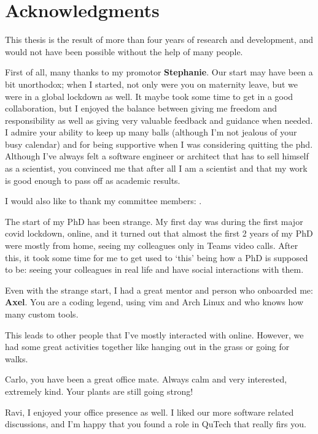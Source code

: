 \chapter*{Acknowledgments}

This thesis is the result of more than four years of research and development, and would not have been possible without the help of many people.

First of all, many thanks to my promotor \textbf{Stephanie}.
Our start may have been a bit unorthodox; when I started, not only were you on maternity leave, but we were in a global lockdown as well.
It maybe took some time to get in a good collaboration, but I enjoyed the balance between giving me freedom and responsibility as well as giving very valuable feedback and guidance when needed.
I admire your ability to keep up many balls (although I'm not jealous of your busy calendar) and for being supportive when I was considering quitting the phd.
Although I've always felt a software engineer or architect that has to sell himself as a scientist, you convinced me that after all I am a scientist and that my work is good enough to pass off as academic results.

I would also like to thank my committee members: .

The start of my PhD has been strange.
My first day was during the first major covid lockdown, online, and it turned out that almost the first 2 years of my PhD were mostly from home, seeing my colleagues only in Teams video calls.
After this, it took some time for me to get used to `this' being how a PhD is supposed to be: seeing your colleagues in real life and have social interactions with them.

Even with the strange start, I had a great mentor and person who onboarded me: \textbf{Axel}.
You are a coding legend, using vim and Arch Linux and who knows how many custom tools.

This leads to other people that I've mostly interacted with online.
However, we had some great activities together like hanging out in the grass or going for walks.

Carlo, you have been a great office mate. Always calm and very interested, extremely kind. Your plants are still going strong!

Ravi, I enjoyed your office presence as well. I liked our more software related discussions, and I'm happy that you found a role in QuTech that really firs you.

